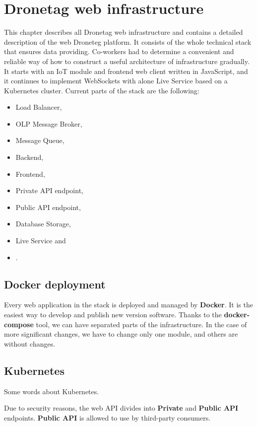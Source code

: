 \chapter{Dronetag web infrastructure}\label{ch:dronetag-web-infrastructure}
This chapter describes all Dronetag web infrastructure and contains a detailed description of the web Droneteg platform.
It consists of the whole technical stack that ensures data providing.
Co-workers had to determine a convenient and reliable way of how to construct a useful architecture of infrastructure gradually.
It starts with an IoT module and frontend web client written in JavaScript, and it continues to implement WebSockets with alone Live Service based on a Kubernetes cluster.
Current parts of the stack are the following:
\begin{itemize}
    \item Load Balancer,
    \item OLP Message Broker,
    \item Message Queue,
    \item Backend,
    \item Frontend,
    \item Private API endpoint,
    \item Public API endpoint,
    \item Database Storage,
    \item Live Service and
    \item .
\end{itemize}

\section{Docker deployment}\label{sec:docker-deployment}
Every web application in the stack is deployed and managed by \textbf{Docker}. %
It is the easiest way to develop and publish new version software.
Thanks to the \textbf{docker-compose} tool, we can have separated parts of the infrastructure.
In the case of more significant changes, we have to change only one module, and others are without changes.

\section{Kubernetes}\label{sec:kubernetes}
Some words about Kubernetes.

Due to security reasons, the web API divides into \textbf{Private} and \textbf{Public API} endpoints.
\textbf{Public API} is allowed to use by third-party consumers.


